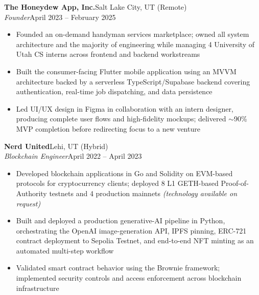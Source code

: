 \documentclass[10.5pt, letterpaper]{article}
\newcommand{\jobentry}[4]{%
  \noindent
  \textbf{\color{accent}#1}\hfill\textcolor{muted}{\small #2}\\
  \textit{#3}\hfill\textcolor{muted}{\small #4}%
}
\begin{document}
\jobentry{The Honeydew App, Inc.}{Salt Lake City, UT (Remote)}{Founder}{April 2023 -- February 2025}
\begin{itemize}
  \item Founded an on-demand handyman services marketplace; owned all system
        architecture and the majority of engineering while managing 4 University
        of Utah CS interns across frontend and backend workstreams
  \item Built the consumer-facing Flutter mobile application using an MVVM
        architecture backed by a serverless TypeScript/Supabase backend covering
        authentication, real-time job dispatching, and data persistence
  \item Led UI/UX design in Figma in collaboration with an intern designer,
        producing complete user flows and high-fidelity mockups; delivered
        $\sim$90\% MVP completion before redirecting focus to a new venture
\end{itemize}

\vspace{5pt}

\jobentry{Nerd United}{Lehi, UT (Hybrid)}{Blockchain Engineer}{April 2022 -- April 2023}
\begin{itemize}
  \item Developed blockchain applications in Go and Solidity on EVM-based protocols
        for cryptocurrency clients; deployed 8 L1 GETH-based Proof-of-Authority
        testnets and 4 production mainnets \textit{(technology available on request)}
  \item Built and deployed a production generative-AI pipeline in Python, orchestrating
        the OpenAI image-generation API, IPFS pinning, ERC-721 contract deployment to
        Sepolia Testnet, and end-to-end NFT minting as an automated multi-step workflow
  \item Validated smart contract behavior using the Brownie framework; implemented
        security controls and access enforcement across blockchain infrastructure
\end{itemize}

\vspace{5pt}
\end{document}
